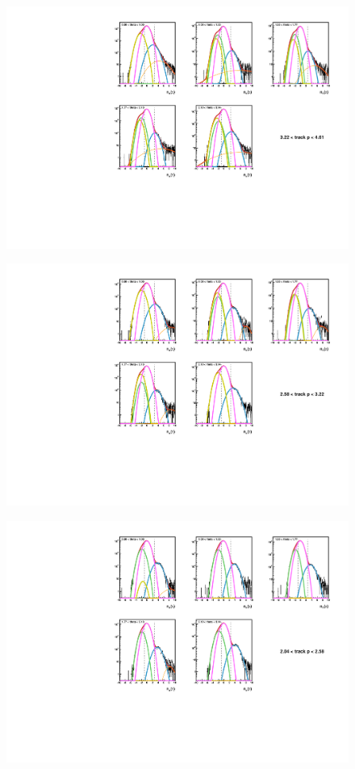 \documentclass[abstract = on,listof=totoc, bibliography=totoc]{scrreprt}
\begin{document}
 \begin{figure}
\begin{center}
\includegraphics[width = .7\textwidth]{5gausFit_pbin_3.pdf}
\caption[]{}
\label{fig:5gaus3}
\end{center}
\end{figure}

 \begin{figure}
\begin{center}
\includegraphics[width = .7\textwidth]{5gausFit_pbin_2.pdf}
\caption[]{}
\label{fig:5gaus2}
\end{center}
\end{figure}

 \begin{figure}
\begin{center}
\includegraphics[width = .7\textwidth]{5gausFit_pbin_1.pdf}
\caption[]{}
\label{fig:5gaus1}
\end{center}
\end{figure}
\end{document}
